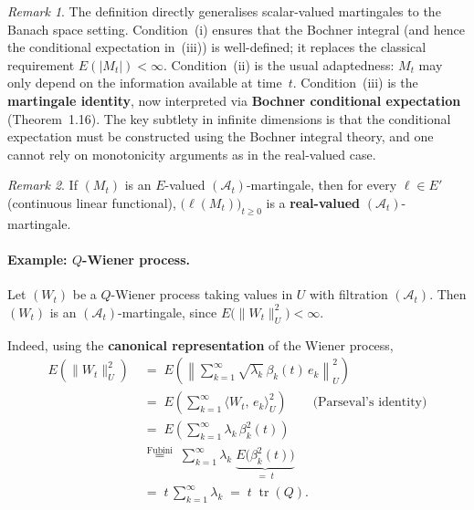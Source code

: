 \documentclass[11pt]{article}
\theoremstyle{definition}
\theoremstyle{remark}
\newtheorem{remark}{Remark}
\DeclareMathOperator{\tr}{tr}
\begin{document}
\begin{remark}
The definition directly generalises scalar-valued martingales to the Banach space setting.
Condition~(i) ensures that the Bochner integral (and hence the conditional expectation in~(iii)) is well-defined; it replaces the classical requirement $E(|M_t|) < \infty$.
Condition~(ii) is the usual adaptedness: $M_t$ may only depend on the information available at time~$t$.
Condition~(iii) is the \textbf{martingale identity}, now interpreted via \textbf{Bochner conditional expectation} (Theorem~1.16).
The key subtlety in infinite dimensions is that the conditional expectation must be constructed using the Bochner integral theory, and one cannot rely on monotonicity arguments as in the real-valued case.
\end{remark}

\begin{remark}
If $(M_t)$ is an $E$-valued $(\mathcal{A}_t)$-martingale,
then for every $\ell \in E'$ (continuous linear functional),
$\bigl(\ell(M_t)\bigr)_{t \ge 0}$ is a \textbf{real-valued}
$(\mathcal{A}_t)$-martingale.
\end{remark}

\paragraph{Example: $Q$-Wiener process.}
Let $(W_t)$ be a $Q$-Wiener process taking values in $U$
with filtration $(\mathcal{A}_t)$.
Then $(W_t)$ is an $(\mathcal{A}_t)$-martingale, since
$E\!\bigl(\|W_t\|_U^2\bigr) < \infty$.


Indeed, using the \textbf{canonical representation} of
the Wiener process,
\begin{align*}
    E\!\left(\|W_t\|_U^2\right)
    &\;=\;
    E\!\left(
        \left\|\sum_{k=1}^{\infty}
        \sqrt{\lambda_k}\,\beta_k(t)\,e_k
        \right\|_U^2
    \right) \\[6pt]
    &\;=\;
    E\!\left(
        \sum_{k=1}^{\infty}
        \bigl\langle W_t,\, e_k \bigr\rangle_U^2
    \right)
    \qquad\text{(Parseval's identity)} \\[6pt]
    &\;=\;
    E\!\left(
        \sum_{k=1}^{\infty}
        \lambda_k\,\beta_k^2(t)
    \right) \\[6pt]
    &\;\stackrel{\text{Fubini}}{=}\;
    \sum_{k=1}^{\infty} \lambda_k\;
    \underbrace{E\!\bigl(\beta_k^2(t)\bigr)}_{=\;t} \\[6pt]
    &\;=\;
    t\,\sum_{k=1}^{\infty} \lambda_k
    \;=\;
    t\;\tr(Q).
\end{align*}
\end{document}
